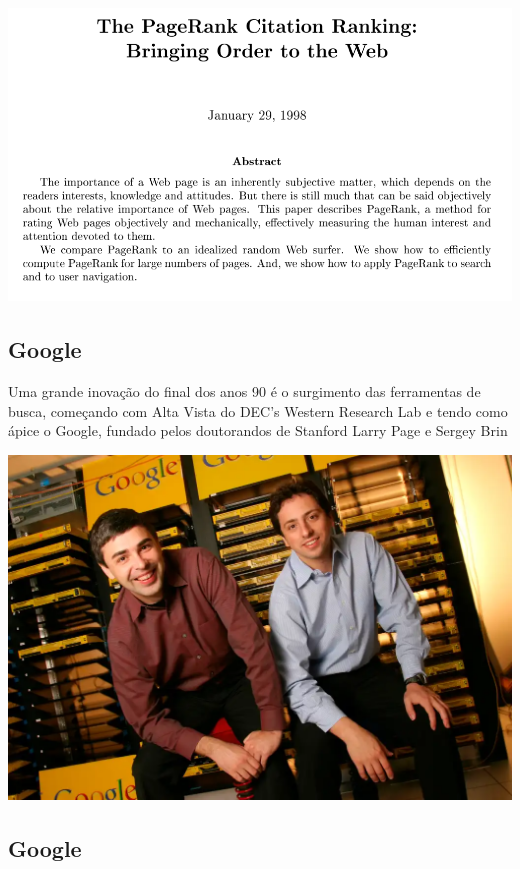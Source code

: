 \documentclass[
  letterpaper,
  DIV=11,
  numbers=noendperiod]{scrartcl}
\begin{document}
\hypertarget{section}{%
\subsection{}\label{section}}

\includegraphics{figs/Aula09/PR-paper.png}

\hypertarget{google}{%
\subsection{Google}\label{google}}

Uma grande inovação do final dos anos 90 é o surgimento das ferramentas
de busca, começando com Alta Vista do DEC's Western Research Lab e tendo
como ápice o Google, fundado pelos doutorandos de Stanford Larry Page e
Sergey Brin

\includegraphics{figs/Aula09/page_brin.webp}

\hypertarget{google-1}{%
\subsection{Google}\label{google-1}}
\end{document}
